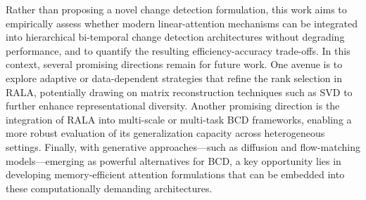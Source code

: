 \documentclass[runningheads]{llncs}
\begin{document}
Rather than proposing a novel change detection formulation, this work aims to
empirically assess whether modern linear-attention mechanisms can be integrated
into hierarchical bi-temporal change detection architectures without degrading
performance, and to quantify the resulting efficiency-accuracy trade-offs. In
this context, several promising directions remain for future work. One avenue is
to explore adaptive or data-dependent strategies that refine the rank selection
in RALA, potentially drawing on matrix reconstruction techniques such as SVD to
further enhance representational diversity. Another promising direction is the
integration of RALA into multi-scale or multi-task BCD frameworks, enabling a
more robust evaluation of its generalization capacity across heterogeneous
settings. Finally, with generative approaches—such as diffusion and
flow-matching models—emerging as powerful alternatives for BCD, a key
opportunity lies in developing memory-efficient attention formulations that can
be embedded into these computationally demanding architectures.
\end{document}
